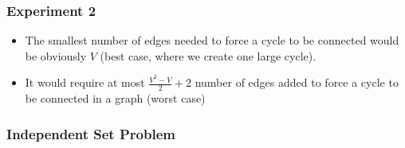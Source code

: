 \documentclass[12pt]{article}
\begin{document}
\subsubsection{Experiment 2}
\begin{itemize}
    \item The smallest number of edges needed to force a cycle to be connected would be obviously $V$ (best case, where we create one large cycle).
    \item It would require at most $\frac{V^2 - V}{2} + 2$ number of edges added to force a cycle to be connected in a graph (worst case) 
  \end{itemize}

\subsubsection{Independent Set Problem}
\end{document}
